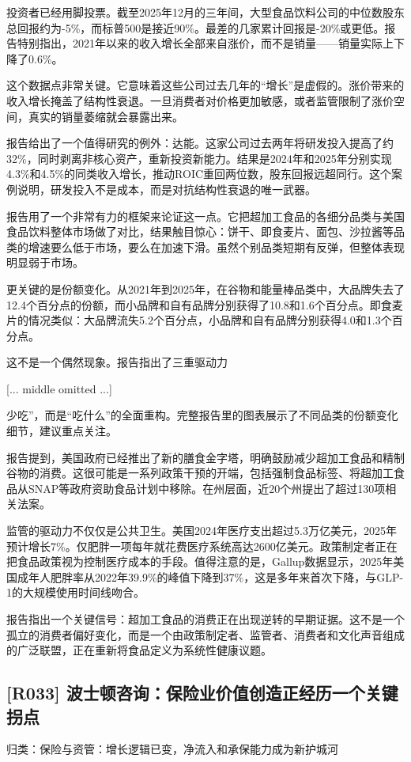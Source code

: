 \documentclass[11pt]{ctexart}
\begin{document}
投资者已经用脚投票。截至2025年12月的三年间，大型食品饮料公司的中位数股东总回报约为-5\%，而标普500是接近90\%。最差的几家累计回报是-20\%或更低。报告特别指出，2021年以来的收入增长全部来自涨价，而不是销量——销量实际上下降了0.6\%。

这个数据点非常关键。它意味着这些公司过去几年的“增长”是虚假的。涨价带来的收入增长掩盖了结构性衰退。一旦消费者对价格更加敏感，或者监管限制了涨价空间，真实的销量萎缩就会暴露出来。

报告给出了一个值得研究的例外：达能。这家公司过去两年将研发投入提高了约32\%，同时剥离非核心资产，重新投资新能力。结果是2024年和2025年分别实现4.3\%和4.5\%的同类收入增长，推动ROIC重回两位数，股东回报远超同行。这个案例说明，研发投入不是成本，而是对抗结构性衰退的唯一武器。

报告用了一个非常有力的框架来论证这一点。它把超加工食品的各细分品类与美国食品饮料整体市场做了对比，结果触目惊心：饼干、即食麦片、面包、沙拉酱等品类的增速要么低于市场，要么在加速下滑。虽然个别品类短期有反弹，但整体表现明显弱于市场。

更关键的是份额变化。从2021年到2025年，在谷物和能量棒品类中，大品牌失去了12.4个百分点的份额，而小品牌和自有品牌分别获得了10.8和1.6个百分点。即食麦片的情况类似：大品牌流失5.2个百分点，小品牌和自有品牌分别获得4.0和1.3个百分点。

这不是一个偶然现象。报告指出了三重驱动力

[... middle omitted ...]

少吃”，而是“吃什么”的全面重构。完整报告里的图表展示了不同品类的份额变化细节，建议重点关注。

报告提到，美国政府已经推出了新的膳食金字塔，明确鼓励减少超加工食品和精制谷物的消费。这很可能是一系列政策干预的开端，包括强制食品标签、将超加工食品从SNAP等政府资助食品计划中移除。在州层面，近20个州提出了超过130项相关法案。

监管的驱动力不仅仅是公共卫生。美国2024年医疗支出超过5.3万亿美元，2025年预计增长7\%。仅肥胖一项每年就花费医疗系统高达2600亿美元。政策制定者正在把食品政策视为控制医疗成本的手段。值得注意的是，Gallup数据显示，2025年美国成年人肥胖率从2022年39.9\%的峰值下降到37\%，这是多年来首次下降，与GLP-1的大规模使用时间线吻合。

报告指出一个关键信号：超加工食品的消费正在出现逆转的早期证据。这不是一个孤立的消费者偏好变化，而是一个由政策制定者、监管者、消费者和文化声音组成的广泛联盟，正在重新将食品定义为系统性健康议题。

\subsection{[R033] 波士顿咨询：保险业价值创造正经历一个关键拐点}
{\small\color{refgray}归类：保险与资管：增长逻辑已变，净流入和承保能力成为新护城河}
\end{document}
